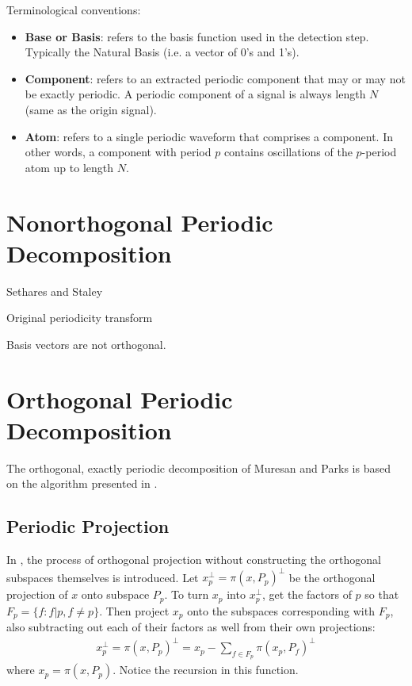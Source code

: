 Terminological conventions:
\begin{addmargin}[4em]{2em}%
\begin{itemize}
    \renewcommand\labelitemi{--}
    \item \textbf{Base or Basis}: refers to the basis function used in the detection step. Typically the Natural Basis (i.e. a vector of 0's and 1's).
    \item \textbf{Component}: refers to an extracted periodic component that may or may not be exactly periodic. A periodic component of a signal is always length $N$ (same as the origin signal).
    \item \textbf{Atom}: refers to a single periodic waveform that comprises a component. In other words, a component with period $p$ contains oscillations of the $p$-period atom up to length $N$.
\end{itemize}
\end{addmargin}

\section{Nonorthogonal Periodic Decomposition}
Sethares and Staley

Original periodicity transform

Basis vectors are not orthogonal.

\section{Orthogonal Periodic Decomposition}\label{section:intro:orthgonalDecomp}

The orthogonal, exactly periodic decomposition of Muresan and Parks is based on the algorithm presented in \cite{wise1976maximum}.

    \subsection{Periodic Projection}
    In \cite{muresan2003orthogonal}, the process of orthogonal projection without constructing the orthogonal subspaces themselves is introduced. Let $x_p^\perp = \pi(x, P_p)^\perp$ be the orthogonal projection of $x$ onto subspace $P_p$. To turn $x_p$ into $x_p^\perp$, get the factors of $p$ so that $F_p = \{f : f|p, f \neq p\}$. Then project $x_p$ onto the subspaces corresponding with $F_p$, also subtracting out each of their factors as well from their own projections:
    \begin{align}\label{eq:intro:orthgonalProjectionLong}
        x_{p}^{\perp} = \pi(x, P_p)^\perp = x_p - \sum_{f \in F_p} \pi(x_p, P_f)^\perp
    \end{align}
    where $x_p = \pi(x, P_p)$. Notice the recursion in this function.

